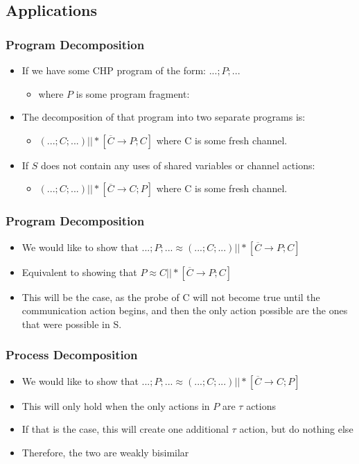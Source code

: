 \documentclass[compress]{beamer}
\begin{document}
\subsection{Applications}
\begin{frame}
\frametitle{Program Decomposition}
\begin{itemize}
\item If we have some CHP program of the form: $...;P;...$
\begin{itemize}
\item where $P$ is some program fragment:
\end{itemize}
\pause
\item The decomposition of that program into two separate programs is:
\begin{itemize}
\item $(...;C;...) || *[\overline{C} \rightarrow P; C] $ where C is some fresh channel.
\end{itemize}
\pause
\item If $S$ does not contain any uses of shared variables or channel actions:
\begin{itemize}
\item$(...;C;...) || *[\overline{C} \rightarrow C; P] $ where C is some fresh channel.
\end{itemize}
\end{itemize}
\end{frame}
\begin{frame}
\frametitle{Program Decomposition}
\begin{itemize}
\item We would like to show that $ ...;P;... \approx (...;C;...) || *[\overline{C} \rightarrow P; C]$
\pause
\item Equivalent to showing that $P \approx C || *[\overline{C} \rightarrow P; C]$
\pause
\item This will be the case, as the probe of C will not become true until the communication action begins, and then the only action possible are the ones that were possible in S.
\end{itemize}
\end{frame}
\begin{frame}
\frametitle{Process Decomposition}
\begin{itemize}
\item We would like to show that $ ...;P;... \approx (...;C;...) || *[\overline{C} \rightarrow C; P]$
\pause
\item This will only hold when the only actions in $P$ are $\tau$ actions
\pause
\item If that is the case, this will create one additional $\tau$ action, but do nothing else
\pause
\item Therefore, the two are weakly bisimilar
\end{itemize}
\end{frame}
\end{document}
